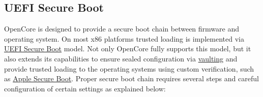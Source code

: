 \documentclass[]{article}
\begin{document}
\subsection{UEFI Secure Boot}\label{uefisecureboot}

OpenCore is designed to provide a secure boot chain between firmware
and operating system. On most x86 platforms trusted loading is implemented
via \href{https://en.wikipedia.org/wiki/UEFI_Secure_Boot}{UEFI Secure Boot} model.
Not only OpenCore fully supports this model, but it also extends its capabilities
to ensure sealed configuration via \hyperref[securevaulting]{vaulting} and
provide trusted loading to the operating systems using custom verification,
such as \hyperref[secureapplesb]{Apple Secure Boot}. Proper secure boot chain
requires several steps and careful configuration of certain settings as explained below:
\end{document}
